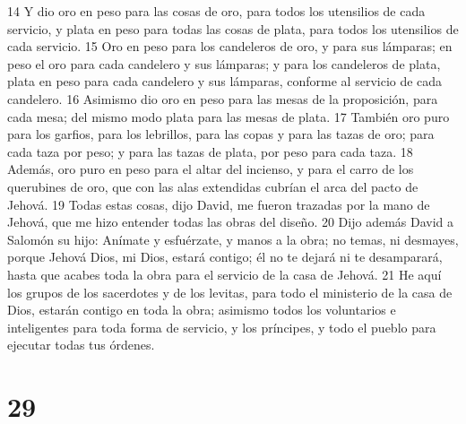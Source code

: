 14 Y dio oro en peso para las cosas de oro, para todos los utensilios de cada servicio, y plata en peso para todas las cosas de plata, para todos los utensilios de cada servicio.
15 Oro en peso para los candeleros de oro, y para sus lámparas; en peso el oro para cada candelero y sus lámparas; y para los candeleros de plata, plata en peso para cada candelero y sus lámparas, conforme al servicio de cada candelero.
16 Asimismo dio oro en peso para las mesas de la proposición, para cada mesa; del mismo modo plata para las mesas de plata.
17 También oro puro para los garfios, para los lebrillos, para las copas y para las tazas de oro; para cada taza por peso; y para las tazas de plata, por peso para cada taza.
18 Además, oro puro en peso para el altar del incienso, y para el carro de los querubines de oro, que con las alas extendidas cubrían el arca del pacto de Jehová.
19 Todas estas cosas, dijo David, me fueron trazadas por la mano de Jehová, que me hizo entender todas las obras del diseño.
20 Dijo además David a Salomón su hijo: Anímate y esfuérzate, y manos a la obra; no temas, ni desmayes, porque Jehová Dios, mi Dios, estará contigo; él no te dejará ni te desamparará, hasta que acabes toda la obra para el servicio de la casa de Jehová.
21 He aquí los grupos de los sacerdotes y de los levitas, para todo el ministerio de la casa de Dios, estarán contigo en toda la obra; asimismo todos los voluntarios e inteligentes para toda forma de servicio, y los príncipes, y todo el pueblo para ejecutar todas tus órdenes.

\chapter{29}


